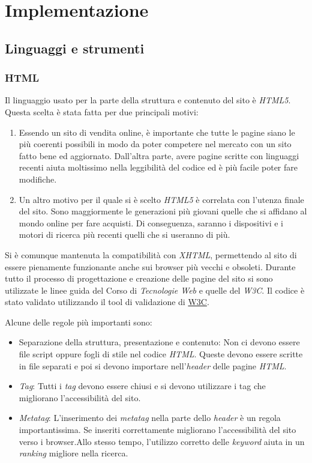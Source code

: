\section{Implementazione}\label{sec:implementazione}

\subsection{Linguaggi e strumenti}
\subsubsection{HTML}
Il linguaggio usato per la parte della struttura e contenuto del sito è \textit{HTML5}. Questa scelta è stata fatta per due principali motivi:
\begin{enumerate}
	\item Essendo un sito di vendita online, è importante che tutte le pagine siano le più coerenti possibili in modo da poter competere nel mercato con un sito fatto bene ed aggiornato. Dall’altra parte, avere pagine scritte con linguaggi recenti aiuta moltissimo nella leggibilità del codice ed è più facile poter fare modifiche.
	\item Un altro motivo per il quale si è scelto \textit{HTML5} è correlata con l’utenza finale del sito. Sono maggiormente le generazioni più giovani quelle che si affidano al mondo online per fare acquisti. Di conseguenza, saranno i dispositivi e i motori di ricerca più recenti quelli che si useranno di più.
\end{enumerate}
Si è comunque mantenuta la compatibilità con \textit{XHTML}, permettendo al sito di essere pienamente funzionante anche sui browser più vecchi e obsoleti.
Durante tutto il processo di progettazione e creazione delle pagine del sito si sono utilizzate le linee guida del Corso di \textit{Tecnologie Web} e quelle del \textit{W3C}. Il codice è stato validato utilizzando il tool di validazione di 
	\href{https://validator.w3.org/}{W3C}.
	
Alcune delle regole più importanti sono:
\begin{itemize}
	\item Separazione della struttura, presentazione e contenuto: Non ci devono essere file script oppure fogli di stile nel codice \textit{HTML}. Queste devono essere scritte in file separati e poi si devono importare nell'\textit{header} delle pagine \textit{HTML}.
	\item \textit{Tag}: Tutti i \textit{tag} devono essere chiusi e si devono utilizzare i tag che migliorano l'accessibilità del sito.
	\item \textit{Metatag}: L’inserimento dei \textit{metatag} nella parte dello \textit{header} è un regola importantissima. Se inseriti correttamente migliorano l’accessibilità del sito verso i browser.Allo stesso tempo, l’utilizzo corretto delle \textit{keyword} aiuta in un \textit{ranking} migliore nella ricerca.
\end{itemize}

